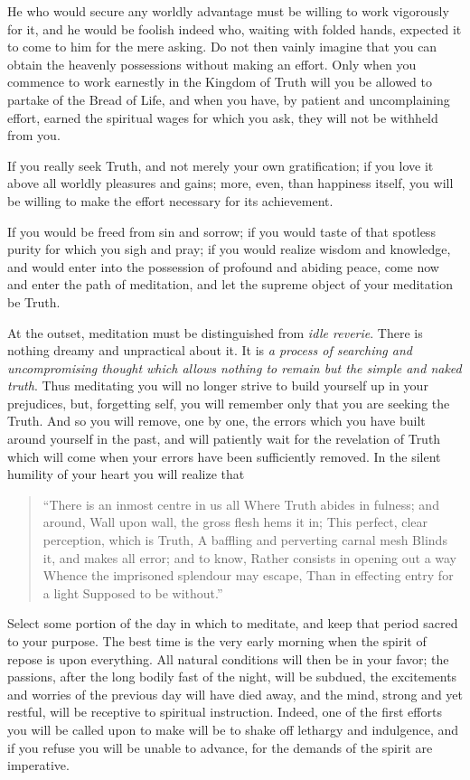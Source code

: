 \documentclass[12pt,oneside]{scrbook}
\begin{document}
  He who would secure any worldly advantage must be willing to work
  vigorously for it, and he would be foolish indeed who, waiting with
  folded hands, expected it to come to him for the mere asking. Do not
  then vainly imagine that you can obtain the heavenly possessions without
  making an effort. Only when you commence to work earnestly in the
  Kingdom of Truth will you be allowed to partake of the Bread of Life,
  and when you have, by patient and uncomplaining effort, earned the
  spiritual wages for which you ask, they will not be withheld from you.
  
  If you really seek Truth, and not merely your own gratification; if you
  love it above all worldly pleasures and gains; more, even, than
  happiness itself, you will be willing to make the effort necessary for
  its achievement.
  
  If you would be freed from sin and sorrow; if you would taste of that
  spotless purity for which you sigh and pray; if you would realize wisdom
  and knowledge, and would enter into the possession of profound and
  abiding peace, come now and enter the path of meditation, and let the
  supreme object of your meditation be Truth.
  
  At the outset, meditation must be distinguished from \emph{idle
  reverie}. There is nothing dreamy and unpractical about it. It is
  \emph{a process of searching and uncompromising thought which allows
  nothing to remain but the simple and naked truth}. Thus meditating you
  will no longer strive to build yourself up in your prejudices, but,
  forgetting self, you will remember only that you are seeking the Truth.
  And so you will remove, one by one, the errors which you have built
  around yourself in the past, and will patiently wait for the revelation
  of Truth which will come when your errors have been sufficiently
  removed. In the silent humility of your heart you will realize that
  
  \begin{quote}
  ``There is an inmost centre in us all Where Truth abides in fulness; and
  around, Wall upon wall, the gross flesh hems it in; This perfect, clear
  perception, which is Truth, A baffling and perverting carnal mesh Blinds
  it, and makes all error; and to know, Rather consists in opening out a
  way Whence the imprisoned splendour may escape, Than in effecting entry
  for a light Supposed to be without.''
  \end{quote}
  
  Select some portion of the day in which to meditate, and keep that
  period sacred to your purpose. The best time is the very early morning
  when the spirit of repose is upon everything. All natural conditions
  will then be in your favor; the passions, after the long bodily fast of
  the night, will be subdued, the excitements and worries of the previous
  day will have died away, and the mind, strong and yet restful, will be
  receptive to spiritual instruction. Indeed, one of the first efforts you
  will be called upon to make will be to shake off lethargy and
  indulgence, and if you refuse you will be unable to advance, for the
  demands of the spirit are imperative.
  
\end{document}
